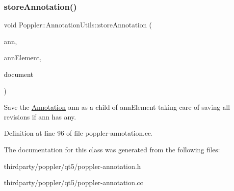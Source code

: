 \mbox{\label{class_poppler_1_1_annotation_utils_a1ef4c62890bcf810bba8d8a08763d784}} 
\subsubsection{\texorpdfstring{store\+Annotation()}{storeAnnotation()}}
{\footnotesize\ttfamily void Poppler\+::\+Annotation\+Utils\+::store\+Annotation (\begin{DoxyParamCaption}\item[{const \hyperlink{class_poppler_1_1_annotation}{Annotation} $\ast$}]{ann,  }\item[{Q\+Dom\+Element \&}]{ann\+Element,  }\item[{Q\+Dom\+Document \&}]{document }\end{DoxyParamCaption})\hspace{0.3cm}{\ttfamily [static]}}

Save the \hyperlink{class_poppler_1_1_annotation}{Annotation} {\ttfamily ann} as a child of {\ttfamily ann\+Element} taking care of saving all revisions if {\ttfamily ann} has any. 

Definition at line 96 of file poppler-\/annotation.\+cc.



The documentation for this class was generated from the following files\+:\begin{DoxyCompactItemize}
\item 
thirdparty/poppler/qt5/poppler-\/annotation.\+h\item 
thirdparty/poppler/qt5/poppler-\/annotation.\+cc\end{DoxyCompactItemize}
